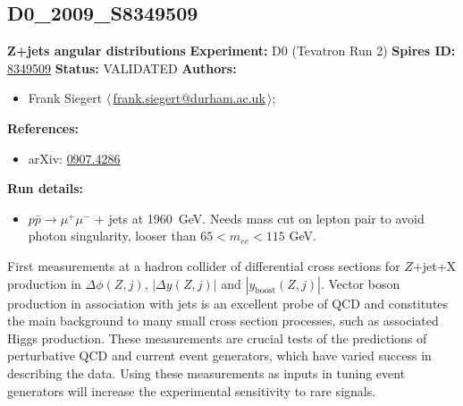 \subsection{D0\_2009\_S8349509}
\textbf{Z+jets angular distributions}\newline
\textbf{Experiment:} D0 (Tevatron Run 2) \newline
\textbf{Spires ID:} \href{http://www.slac.stanford.edu/spires/find/hep/www?rawcmd=key+8349509}{8349509}\newline
\textbf{Status:} VALIDATED\newline
\textbf{Authors:}
\begin{itemize}
  \item Frank Siegert $\langle\,$\href{mailto:frank.siegert@durham.ac.uk}{frank.siegert@durham.ac.uk}$\,\rangle$;
\end{itemize}
\textbf{References:}
\begin{itemize}
  \item arXiv: \href{http://arxiv.org/abs/0907.4286}{0907.4286}
\end{itemize}
\textbf{Run details:}
\begin{itemize}

  \item $p \bar{p} \to \mu^+ \mu^-$ + jets at 1960~GeV. Needs mass cut on lepton pair to avoid photon singularity, looser than $65 < m_{ee} < 115$ GeV.\end{itemize}

\noindent First measurements at a hadron collider of differential cross sections for $Z$+jet+X production in $\Delta\phi(Z, j)$, $|\Delta y(Z, j)|$ and $|y_\mathrm{boost}(Z, j)|$. Vector boson production in association with jets is an excellent probe of QCD and constitutes the main background to many small cross section processes, such as associated Higgs production. These measurements are crucial tests of the predictions of perturbative QCD and current event generators, which have varied success in describing the data. Using these measurements as inputs in tuning event generators will increase the experimental sensitivity to rare signals.

\clearpage


\clearpage

